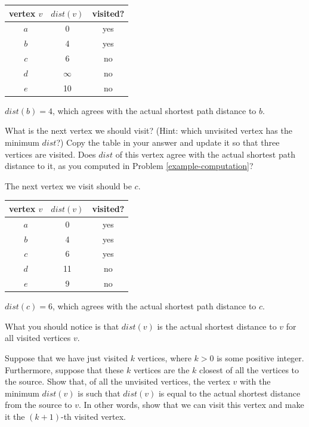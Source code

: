 \documentclass[11pt]{article}
\begin{document}
\begin{center}
\begin{tabular}{ c | c | c }
vertex $v$ & $dist(v)$ & visited? \\
\hline
$a$ & 0 & yes \\
$b$ & 4 & yes \\
$c$ & 6 & no \\
$d$ & $\infty$ & no \\
$e$ & 10 & no
\end{tabular}
\end{center}

$dist(b) = 4$, which agrees with the actual shortest path distance to $b$.

\begin{problem} %
What is the next vertex we should visit? (Hint: which unvisited vertex has the minimum $dist$?)
Copy the table in your answer and update it so that three vertices are visited. Does $dist$ of this vertex agree with the actual
shortest path distance to it, as you computed in Problem \ref{example-computation}?
\end{problem}

\begin{solution}
The next vertex we visit should be $c$.
\begin{center}
\begin{tabular}{ c | c | c }
vertex $v$ & $dist(v)$ & visited? \\
\hline
$a$ & 0 & yes \\
$b$ & 4 & yes \\
$c$ & 6 & yes \\
$d$ & 11 & no \\
$e$ & 9 & no
\end{tabular}
\end{center}
$dist(c) = 6$, which agrees with the actual shortest path distance to $c$.
\end{solution}

What you should notice is that $dist(v)$ is the actual shortest distance to $v$ for all visited vertices $v$.

\begin{problem} %
Suppose that we have just visited $k$ vertices, where $k > 0$ is some positive integer. Furthermore, suppose that these $k$ vertices
are the $k$ closest of all the vertices to the source. Show that, of all the unvisited vertices, the vertex $v$ with the minimum $dist(v)$
is such that $dist(v)$ is equal to the actual shortest distance from the source to $v$. In other words, show that we can visit this vertex
and make it the $(k+1)$-th visited vertex.
\end{problem}
\end{document}
